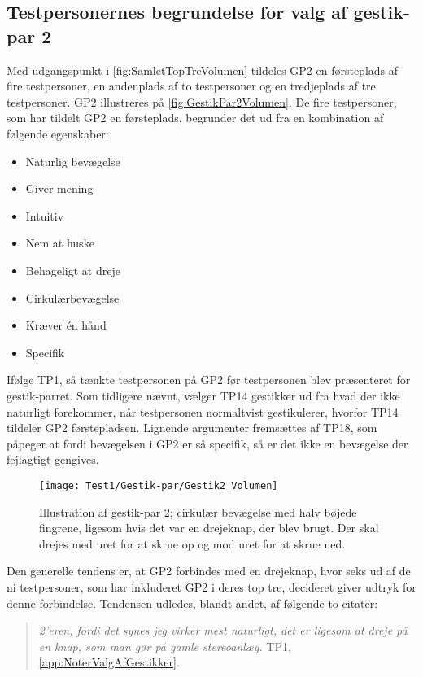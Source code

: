 \subsection{Testpersonernes begrundelse for valg af gestik-par 2}
\label{TestresultaterValgAfGestikkerBegrundelseGP2Volumen}
%
Med udgangspunkt i \autoref{fig:SamletTopTreVolumen} tildeles GP2 en førsteplads af fire testpersoner, en andenplads af to testpersoner og en tredjeplads af tre testpersoner. GP2 illustreres på \autoref{fig:GestikPar2Volumen}. De fire testpersoner, som har tildelt GP2 en førsteplads, begrunder det ud fra en kombination af følgende egenskaber: 
%
\begin{multicols}{3}
    \begin{itemize}
        \item Naturlig bevægelse
        \item Giver mening
        \item Intuitiv 
        \item Nem at huske
        \item Behageligt at dreje
        \item Cirkulærbevægelse
        \item Kræver én hånd
        \item Specifik
\end{itemize}
\end{multicols}
\noindent
%
Ifølge TP1, så tænkte testpersonen på GP2 før testpersonen blev præsenteret for gestik-parret. Som tidligere nævnt, vælger TP14 gestikker ud fra hvad der ikke naturligt forekommer, når testpersonen normaltvist gestikulerer, hvorfor TP14 tildeler GP2 førstepladsen. Lignende argumenter fremsættes af TP18, som påpeger at fordi bevægelsen i GP2 er så specifik, så er det ikke en bevægelse der fejlagtigt gengives. 
%
\begin{figure}[H]
	\centering
	\texttt{[image: Test1/Gestik-par/Gestik2\_Volumen]}
	\caption{Illustration af gestik-par 2; cirkulær bevægelse med halv bøjede fingrene, ligesom hvis det var en drejeknap, der blev brugt. Der skal drejes med uret for at skrue op og mod uret for at skrue ned.}
	\label{fig:GestikPar2Volumen}
\end{figure}
\noindent
%
Den generelle tendens er, at GP2 forbindes med en drejeknap, hvor seks ud af de ni testpersoner, som har inkluderet GP2 i deres top tre, decideret giver udtryk for denne forbindelse. Tendensen udledes, blandt andet, af følgende to citater: 
%
\begin{quotation}
	\noindent
	\textit{2'eren, fordi det synes jeg virker mest naturligt, det er ligesom at dreje på en knap, som man gør på gamle stereoanlæg.} TP1, \autoref{app:NoterValgAfGestikker}.
\noindent
\end{quotation}
